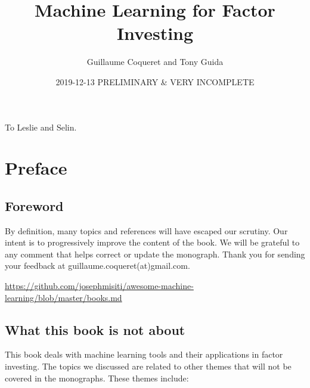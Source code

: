 \documentclass[]{krantz}
\title{Machine Learning for Factor Investing}
\author{Guillaume Coqueret and Tony Guida}
\date{2019-12-13 PRELIMINARY \& VERY INCOMPLETE}
\theoremstyle{definition}
\theoremstyle{definition}
\theoremstyle{definition}
\theoremstyle{remark}
\begin{document}
\maketitle


\thispagestyle{empty}

\begin{center}
To Leslie and Selin.
\end{center}

\setlength{\abovedisplayskip}{-5pt}
\setlength{\abovedisplayshortskip}{-5pt}

{
\hypersetup{linkcolor=}
\setcounter{tocdepth}{2}
\tableofcontents
}
\listoftables
\listoffigures
\mainmatter

\hypertarget{preface}{%
\chapter{Preface}\label{preface}}

\hypertarget{foreword}{%
\section{Foreword}\label{foreword}}

By definition, many topics and references will have escaped our
scrutiny. Our intent is to progressively improve the content of the
book. We will be grateful to any comment that helps correct or update
the monograph. Thank you for sending your feedback at
guillaume.coqueret(at)gmail.com.

\url{https://github.com/josephmisiti/awesome-machine-learning/blob/master/books.md}

\hypertarget{what-this-book-is-not-about}{%
\section{What this book is not
about}\label{what-this-book-is-not-about}}

This book deals with machine learning tools and their applications in
factor investing. The topics we discussed are related to other themes
that will not be covered in the monographs. These themes include:
\end{document}
